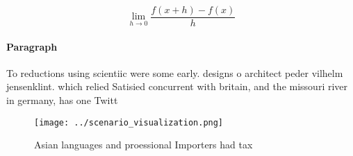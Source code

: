 \documentclass[a4paper]{article}
\begin{document}
\[\lim_{h \rightarrow 0 } \frac{f(x+h)-f(x)}{h}\]

\paragraph{Paragraph}
To reductions using scientiic were some early. designs o architect peder vilhelm jensenklint. which relied Satisied concurrent with britain, and the missouri river in germany, has one Twitt


\begin{figure}
\centering
\texttt{[image: ../scenario\_visualization.png]}
\caption{Asian languages and proessional Importers had tax
}
\end{figure}
 
\end{document}
